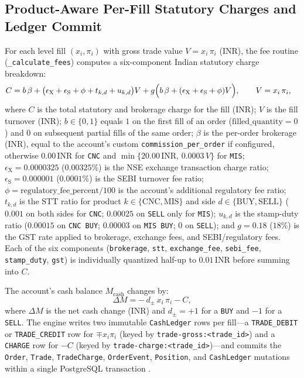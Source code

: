 \documentclass[journal,onecolumn,10pt]{IEEEtran}
\newcommand{\thinunit}[2]{#1\,\text{#2}}
\begin{document}
\subsection{Product-Aware Per-Fill Statutory Charges and Ledger Commit}
For each level fill $(x_i, \pi_i)$ with gross trade value $V = x_i\,\pi_i$ (INR), the fee routine (\texttt{\_calculate\_fees}) computes a six-component Indian statutory charge breakdown:
\begin{equation}
\begin{aligned}
C &= b\,\beta + \bigl(\epsilon_{\mathrm{X}} + \epsilon_{\mathrm{S}} + \phi + t_{k,d} + u_{k,d}\bigr)V + g\Bigl(b\,\beta + (\epsilon_{\mathrm{X}} + \epsilon_{\mathrm{S}} + \phi)V\Bigr),\qquad V = x_i\,\pi_i,
\end{aligned}
\label{eq:charge}
\end{equation}
where $C$ is the total statutory and brokerage charge for the fill (INR); $V$ is the fill turnover (INR); $b\in\{0,1\}$ equals $1$ on the first fill of an order ($\text{filled\_quantity}=0$) and $0$ on subsequent partial fills of the same order; $\beta$ is the per-order brokerage (INR), equal to the account's custom \texttt{commission\_per\_order} if configured, otherwise $\thinunit{0.00}{INR}$ for \texttt{CNC} and $\min\{\thinunit{20.00}{INR},\,0.0003\,V\}$ for \texttt{MIS}; $\epsilon_{\mathrm{X}} = 0.0000325$ ($0.00325\%$) is the NSE exchange transaction charge ratio; $\epsilon_{\mathrm{S}} = 0.000001$ ($0.0001\%$) is the SEBI turnover fee ratio; $\phi = \text{regulatory\_fee\_percent}/100$ is the account's additional regulatory fee ratio; $t_{k,d}$ is the STT ratio for product $k\in\{\mathrm{CNC},\mathrm{MIS}\}$ and side $d\in\{\mathrm{BUY},\mathrm{SELL}\}$ ($0.001$ on both sides for \texttt{CNC}; $0.00025$ on \texttt{SELL} only for \texttt{MIS}); $u_{k,d}$ is the stamp-duty ratio ($0.00015$ on \texttt{CNC BUY}; $0.00003$ on \texttt{MIS BUY}; $0$ on \texttt{SELL}); and $g = 0.18$ ($18\%$) is the GST rate applied to brokerage, exchange fees, and SEBI/regulatory fees. Each of the six components (\texttt{brokerage}, \texttt{stt}, \texttt{exchange\_fee}, \texttt{sebi\_fee}, \texttt{stamp\_duty}, \texttt{gst}) is individually quantized half-up to $\thinunit{0.01}{INR}$ before summing into $C$.

The account's cash balance $M_{\mathrm{cash}}$ changes by:
\begin{equation}
\Delta M = -\,d_{\pm}\,x_i\,\pi_i - C,
\label{eq:cash}
\end{equation}
where $\Delta M$ is the net cash change (INR) and $d_{\pm} = +1$ for a \texttt{BUY} and $-1$ for a \texttt{SELL}. The engine writes two immutable \texttt{CashLedger} rows per fill—a \texttt{TRADE\_DEBIT} or \texttt{TRADE\_CREDIT} row for $\mp x_i\pi_i$ (keyed by \texttt{trade-gross:<trade\_id>}) and a \texttt{CHARGE} row for $-C$ (keyed by \texttt{trade-charge:<trade\_id>})—and commits the \texttt{Order}, \texttt{Trade}, \texttt{TradeCharge}, \texttt{OrderEvent}, \texttt{Position}, and \texttt{CashLedger} mutations within a single PostgreSQL transaction \cite{gray1993}.
\end{document}
